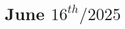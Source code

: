 \documentclass[../main.tex]{subfiles}
\begin{document}
\chapter{June $16^{th} / 2025$}
\label{ch:tufte-design}
\end{document}
